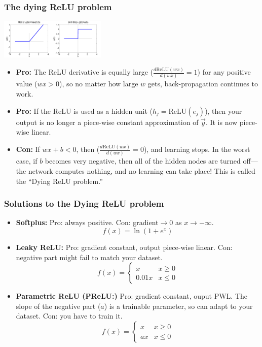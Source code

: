 \documentclass{beamer}
\begin{document}
\begin{frame}
  \frametitle{The dying ReLU problem}
  \centerline{\includegraphics[width=1in]{../lec07/figs/nn_relu.png}\includegraphics[width=1in]{../lec07/figs/nn_unitstep.png}}

  \begin{itemize}
    \item {\bf Pro:} The ReLU derivative is equally large
      ($\frac{d\mbox{ReLU}(wx)}{d(wx)}=1$) for any positive value
      ($wx>0$), so no matter how large $w$ gets, back-propagation
      continues to work.
    \item {\bf Pro:} If the ReLU is used as a hidden unit
      ($h_j=\mbox{ReLU}(e_j)$), then your output is no longer a
      piece-wise constant approximation of $\vec{y}$.  It is now
      piece-wise linear.
    \item {\bf Con:} If $wx+b<0$, then
      ($\frac{d\mbox{ReLU}(wx)}{d(wx)}=0$), and learning stops.
      In the worst case, if $b$ becomes very negative, then all of the
      hidden nodes are turned off---the network computes nothing, and
      no learning can take place!  This is called the ``Dying ReLU
      problem.''
  \end{itemize}
\end{frame}

\begin{frame}
  \frametitle{Solutions to the Dying ReLU problem}

  \begin{itemize}
  \item {\bf Softplus:}  Pro: always positive.  Con: gradient$\rightarrow 0$ as $x\rightarrow -\infty$.
    \[
    f(x) = \ln\left(1+e^x\right)
    \]
  \item {\bf Leaky ReLU:} Pro: gradient constant, output piece-wise linear.  Con:
    negative part might fail to match your dataset.
    \[
    f(x) = \begin{cases}
      x & x \ge 0\\
      0.01x & x \le 0
    \end{cases}
    \]
  \item {\bf Parametric ReLU (PReLU:)} Pro: gradient constant, ouput
    PWL.  The slope of the negative part ($a$) is a trainable
    parameter, so can adapt to your dataset.  Con: you have to train it.
    \[
    f(x) = \begin{cases}
      x & x \ge 0\\
      ax & x \le 0
    \end{cases}
    \]
  \end{itemize}
\end{frame}
\end{document}
